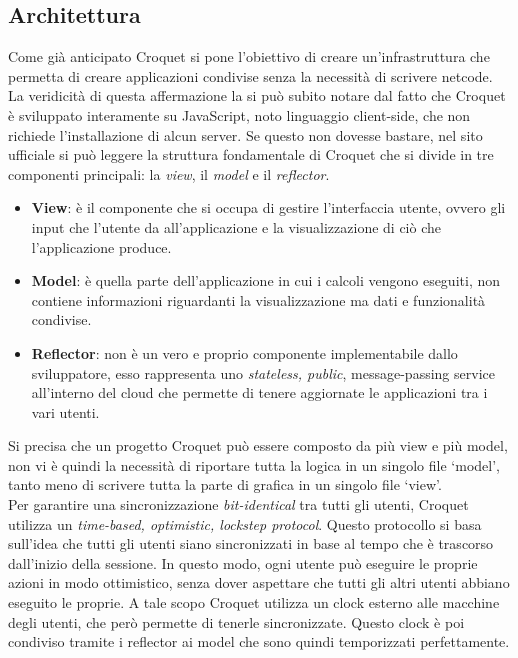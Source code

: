 \subsection{Architettura}\label{subsec:Croquet_architettura}
Come già anticipato Croquet si pone l'obiettivo di creare un'infrastruttura che permetta di creare applicazioni condivise senza la necessità di scrivere netcode. La veridicità di
questa affermazione la si può subito notare dal fatto che Croquet è sviluppato interamente su JavaScript, noto linguaggio client-side, che non richiede l'installazione di alcun server. 
Se questo non dovesse bastare, nel sito ufficiale si può leggere la struttura fondamentale di Croquet che si divide in tre componenti principali: la \textit{view}, il \textit{model}
e il \textit{reflector}.
\begin{itemize}
    \item \textbf{View}: è il componente che si occupa di gestire l'interfaccia utente, ovvero gli input che l'utente da all'applicazione e la visualizzazione di ciò che
    l'applicazione produce. 
    \item \textbf{Model}: è quella parte dell'applicazione in cui i calcoli vengono eseguiti, non contiene informazioni riguardanti la visualizzazione ma dati e 
    funzionalità condivise.
    \item \textbf{Reflector}: non è un vero e proprio componente implementabile dallo sviluppatore, esso rappresenta uno \textit{stateless, public}, message-passing service
    all'interno del cloud che permette di tenere aggiornate le applicazioni tra i vari utenti.
\end{itemize}
Si precisa che un progetto Croquet può essere composto da più view e più model, non vi è quindi la necessità di riportare tutta la logica in un singolo file `model', tanto meno di
scrivere tutta la parte di grafica in un singolo file `view'.\\
Per garantire una sincronizzazione \textit{bit-identical} tra tutti gli utenti, Croquet utilizza un \textit{time-based, optimistic, lockstep protocol}. Questo protocollo si basa
sull'idea che tutti gli utenti siano sincronizzati in base al tempo che è trascorso dall'inizio della sessione. In questo modo, ogni utente può eseguire le proprie azioni in modo
ottimistico, senza dover aspettare che tutti gli altri utenti abbiano eseguito le proprie. A tale scopo Croquet utilizza un clock esterno alle macchine degli utenti, che però
permette di tenerle sincronizzate. Questo clock è poi condiviso tramite i reflector ai model che sono quindi temporizzati perfettamente.\\
